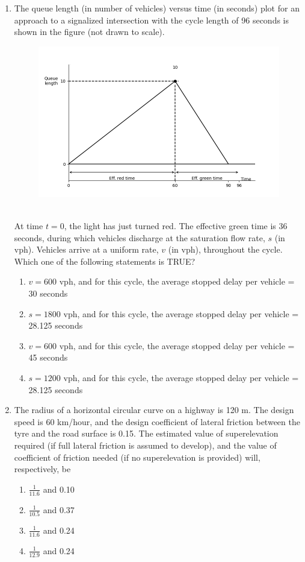 \documentclass[journal]{IEEEtran}
\begin{document}
\begin{enumerate}
\item The queue length (in number of vehicles) versus time (in seconds) plot for an approach to a signalized intersection with the cycle length of 96 seconds is shown in the figure (not drawn to scale).
\begin{figure}[h!]
    \centering
    \includegraphics[width=0.5\linewidth]{figs/figure.png}
    \label{fig:enter-label}
\end{figure}\\
At time $t=0$, the light has just turned red. The effective green time is 36 seconds, during which vehicles discharge at the saturation flow rate, $s$ (in vph). Vehicles arrive at a uniform rate, $v$ (in vph), throughout the cycle. Which one of the following statements is TRUE?
\begin{multicols}{2}
    \begin{enumerate}
        \item $v = 600$ vph, and for this cycle, the average stopped delay per vehicle = 30 seconds 
        \item $s = 1800$ vph, and for this cycle, the average stopped delay per vehicle = 28.125 seconds 
        \item $v = 600$ vph, and for this cycle, the average stopped delay per vehicle = 45 seconds 
        \item $s = 1200$ vph, and for this cycle, the average stopped delay per vehicle = 28.125 seconds
    \end{enumerate}
\end{multicols}

\item The radius of a horizontal circular curve on a highway is 120 m. The design speed is 60 km/hour, and the design coefficient of lateral friction between the tyre and the road surface is 0.15. The estimated value of superelevation required (if full lateral friction is assumed to develop), and the value of coefficient of friction needed (if no superelevation is provided) will, respectively, be
\begin{multicols}{2}
    \begin{enumerate}
        \item $\frac{1}{11.6}$ and 0.10
        \item $\frac{1}{10.5}$ and 0.37
        \item $\frac{1}{11.6}$ and 0.24
        \item $\frac{1}{12.9}$ and 0.24
    \end{enumerate}
\end{multicols}


\end{enumerate}
\end{document}

